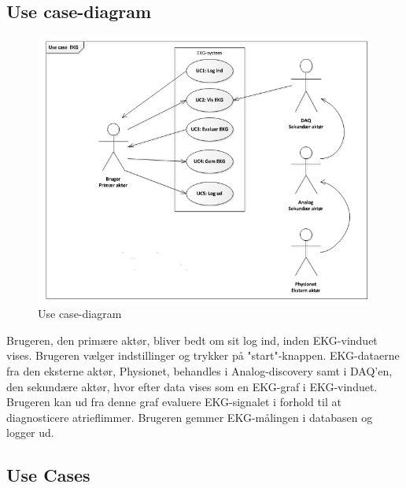 \subsection{Use case-diagram}

\begin{figure}[htb]
	\centering
	\includegraphics[width=1\textwidth]{Figurer/Snip20150327_24}
	\caption{Use case-diagram}
	\label{fig:Use Cases}
\end{figure}

Brugeren, den primære aktør, bliver bedt om sit log ind, inden EKG-vinduet vises. Brugeren vælger indstillinger og trykker på "start"-knappen. EKG-dataerne fra den eksterne aktør, Physionet, behandles i Analog-discovery samt i DAQ'en, den sekundære aktør, hvor efter data vises som en EKG-graf i EKG-vinduet. Brugeren kan ud fra denne graf evaluere EKG-signalet i forhold til at diagnosticere atrieflimmer. Brugeren gemmer EKG-målingen i databasen og logger ud. 

\subsection{Use Cases}

